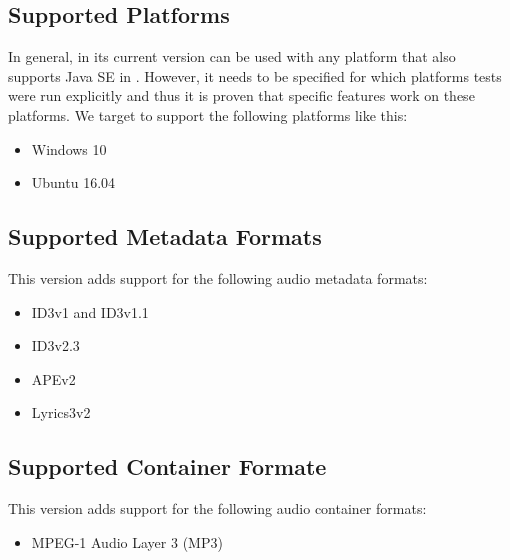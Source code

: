 \subsection{Supported Platforms}
\label{sec:SupportedPlatforms}

In general, \LibName{} in its current version \LibVersion{} can be used with any platform that also supports Java SE in \JavaVersion{}. However, it needs to be specified for which platforms tests were run explicitly and thus it is proven that specific features work on these platforms. We target to support the following platforms like this:
\begin{itemize}
\item Windows 10
\item Ubuntu 16.04
\end{itemize}


\subsection{Supported Metadata Formats}
\label{sec:UnterstuetzteMetadatenformate}

This version adds support for the following audio metadata formats:

\begin{itemize}
\item ID3v1 and ID3v1.1
\item ID3v2.3
\item APEv2
\item Lyrics3v2
\end{itemize}


\subsection{Supported Container Formate}
\label{sec:UnterstuetzteContainerformate}

This version adds support for the following audio container formats:

\begin{itemize}
\item MPEG-1 Audio Layer 3 (MP3)
\end{itemize}


